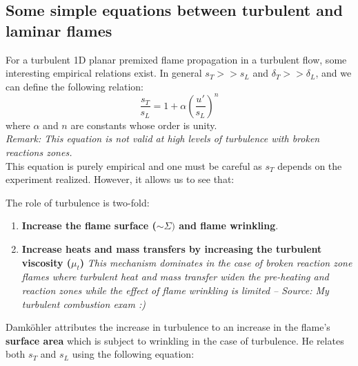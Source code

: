 \documentclass[a4paper,11pt]{article}
\begin{document}
\subsection{Some simple equations between turbulent and laminar flames}
For a turbulent 1D planar premixed flame propagation in a turbulent flow, some interesting empirical relations exist. In general $s_T >> s_L$ and $\delta_T>>\delta_L$, and we can define the following relation:
\[
\frac{s_T}{s_L} = 1+ \alpha (\frac{u'}{s_L})^n
\]
where $\alpha$ and $n$ are constants whose order is unity.\\
\textit{Remark: This equation is not valid at high levels of turbulence with broken reactions zones.}\\
This equation is purely empirical and one must be careful as $s_T$ depends on the experiment realized. However, it allows us to see that:
\begin{center}
\end{center}
\vspace{5pt}
The role of turbulence is two-fold:
\begin{enumerate}
	\item \textbf{Increase the flame surface ($\sim \Sigma)$ and flame wrinkling}.
	\item \textbf{Increase heats and mass transfers by increasing the turbulent viscosity ($\mu_t$)} \textit{This mechanism dominates in the case of broken reaction zone flames where turbulent heat and mass transfer widen the pre-heating and reaction zones while the effect of flame wrinkling is limited -- Source: My turbulent combustion exam :)}
\end{enumerate}
\vspace{5pt}
Damköhler attributes the increase in turbulence to an increase in the flame's \textbf{surface area} which is subject to wrinkling in the case of turbulence. He relates both $s_T$ and $s_L$ using the following equation:
\end{document}
